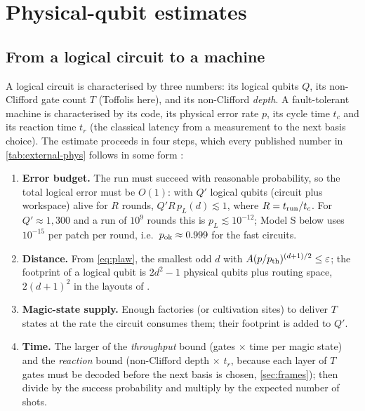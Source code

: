 \section{Physical-qubit estimates}\label{sec:physical}

\subsection{From a logical circuit to a machine}
A logical circuit is characterised by three numbers: its logical qubits $Q$, its non-Clifford gate count $T$ (Toffolis here), and its non-Clifford \emph{depth}. A fault-tolerant machine is characterised by its code, its physical error rate $p$, its cycle time $t_c$ and its reaction time $t_r$ (the classical latency from a measurement to the next basis choice). The estimate proceeds in four steps, which every published number in \cref{tab:external-phys} follows in some form \cite{fowler-gidney18,litinski19game,gidney-ekera21,gidney25rsa}:
\begin{enumerate}[leftmargin=*]
\item \textbf{Error budget.} The run must succeed with reasonable probability, so the total logical error must be $O(1)$: with $Q'$ logical qubits (circuit plus workspace) alive for $R$ rounds, $Q'R\,p_L(d)\lesssim1$, where $R=t_{\rm run}/t_c$. For $Q'\approx1{,}300$ and a run of $10^9$ rounds this is $p_L\lesssim10^{-12}$; Model S below uses $10^{-15}$ per patch per round, i.e.\ $p_{\rm ok}\approx0.999$ for the fast circuits.
\item \textbf{Distance.} From \cref{eq:plaw}, the smallest odd $d$ with $A(p/p_{\rm th})^{(d+1)/2}\le\varepsilon$; the footprint of a logical qubit is $2d^2-1$ physical qubits plus routing space, $2(d+1)^2$ in the layouts of \cite{gidney-ekera21,gidney25rsa}.
\item \textbf{Magic-state supply.} Enough factories (or cultivation sites) to deliver $T$ states at the rate the circuit consumes them; their footprint is added to $Q'$.
\item \textbf{Time.} The larger of the \emph{throughput} bound (gates $\times$ time per magic state) and the \emph{reaction} bound (non-Clifford depth $\times$ $t_r$, because each layer of $T$ gates must be decoded before the next basis is chosen, \cref{sec:frames}); then divide by the success probability and multiply by the expected number of shots.
\end{enumerate}

